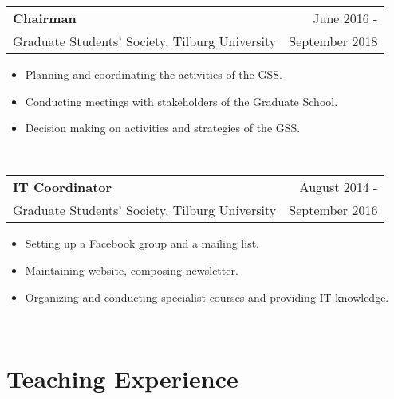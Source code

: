 \documentclass[a4paper,12pt]{article}
\begin{document}
\begin{tabular}{p{12cm}r}
\textbf{Chairman}  &June 2016 -\\
Graduate Students' Society, {Tilburg University} & September 2018\phantom{ -}\\
\end{tabular}
\begin{itemize}[noitemsep]
	\item Planning and coordinating the activities of the GSS.
	\item Conducting meetings with stakeholders of the Graduate School.
	\item Decision making on activities and strategies of the GSS.
\end{itemize}\vspace{1em}\\

\begin{tabular}{p{12cm}r}
\textbf{IT Coordinator} &August 2014 -\\
Graduate Students' Society, {Tilburg University}  & September 2016\phantom{ -}\\
\end{tabular}
\begin{itemize}[noitemsep]
	\item Setting up a Facebook group and a mailing list.
	\item Maintaining website, composing newsletter.
	\item Organizing and conducting specialist courses and providing IT knowledge.
\end{itemize}\\

\section{Teaching Experience}
\end{document}
